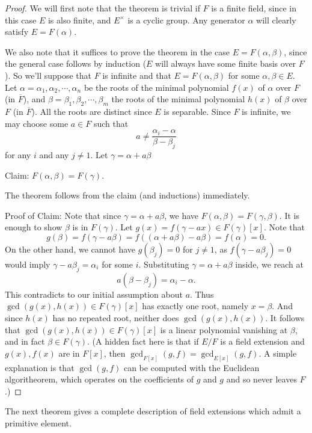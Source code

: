 \documentclass[12pt]{report}
\theoremstyle{definition}
\begin{document}
\begin{proof}
	We will first note that the theorem is trivial if $F$ is a finite field, since in this case $E$ is also finite, and $E^\times$ is a cyclic group. Any generator $\alpha$ will clearly satisfy $E = F(\alpha)$.

	We also note that it suffices to prove the theorem in the case $E = F(\alpha,\beta)$, since the general case follows by induction ($E$ will always have some finite basis over $F$). So we'll suppose that $F$ is infinite and that $E=F(\alpha,\beta)$ for some $\alpha,\beta\in E$.
	Let $\alpha=\alpha_1,\alpha_2,\cdots,\alpha_n$ be the roots of the minimal polynomial $f(x)$ of $\alpha$ over $F$ (in $\overline{F}$), and $\beta=\beta_1,\beta_2,\cdots,\beta_m$ the roots of the minimal polynomial $h(x)$ of $\beta$ over $F$ (in $\overline{F}$). All the roots are distinct since $E$ is separable. Since $F$ is infinite, we may choose some $a \in F$ such that $$a\not= \frac{\alpha_i-\alpha}{\beta-\beta_j}$$ for any $i$ and any $j \not= 1$. Let $\gamma = \alpha+a\beta$

	Claim: $F(\alpha,\beta)=F(\gamma)$.

	The theorem follows from the claim (and inductions) immediately.

	Proof of Claim: Note that since $\gamma = \alpha+a\beta$, we have $F(\alpha,\beta)=F(\gamma,\beta)$. It is enough to show $\beta$ is in $F(\gamma)$. Let $g(x) = f(\gamma - ax) \in F(\gamma)[x]$. Note that
	$$g(\beta) =f(\gamma - a \beta) = f((\alpha+a\beta)-a\beta) = f(\alpha) = 0.$$
	On the other hand, we cannot have $g(\beta_j)=0$ for $j \not=1$, as $f(\gamma - a\beta_j)=0$ would imply $\gamma-a\beta_j=\alpha_i$ for some $i$. Substituting $\gamma= \alpha+a\beta$ inside, we reach at
	$$a(\beta-\beta_j)=\alpha_i-\alpha.$$
	This contradicts to our initial assumption about $a$. Thus $\gcd(g(x), h(x))\in F(\gamma)[x]$ has exactly one root, namely $x =\beta$. And since $h(x)$ has no repeated root, neither does $\gcd(g(x), h(x))$. It follows that $\gcd(g(x), h(x)) \in F(\gamma)[x]$ is a linear polynomial vanishing at $\beta$, and in fact $\beta \in F(\gamma)$. (A hidden fact here is that if $E/F$ is a field extension and $g(x),f(x)$ are in $F[x]$, then $\gcd_{F[x]}(g,f) = \gcd_{E[x]}(g,f)$. A simple explanation is that $\gcd(g,f)$ can be computed with the Euclidean algoritheorem, which operates on the coefficients of $g$ and $g$ and so never leaves $F$.)
\end{proof}

The next theorem gives a complete description of field extensions which admit a primitive
element.
\end{document}
